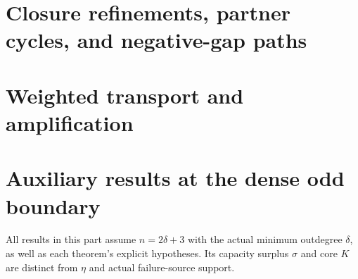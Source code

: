 

\clearpage
\part{Closure refinements, partner cycles, and negative-gap paths}





























\clearpage
\part{Weighted transport and amplification}





\clearpage
\part{Auxiliary results at the dense odd boundary}

All results in this part assume $n=2\delta+3$ with the actual minimum outdegree $\delta$, as well as each theorem's explicit hypotheses. Its capacity surplus $\sigma$ and core $K$ are distinct from $\eta$ and actual failure-source support.

